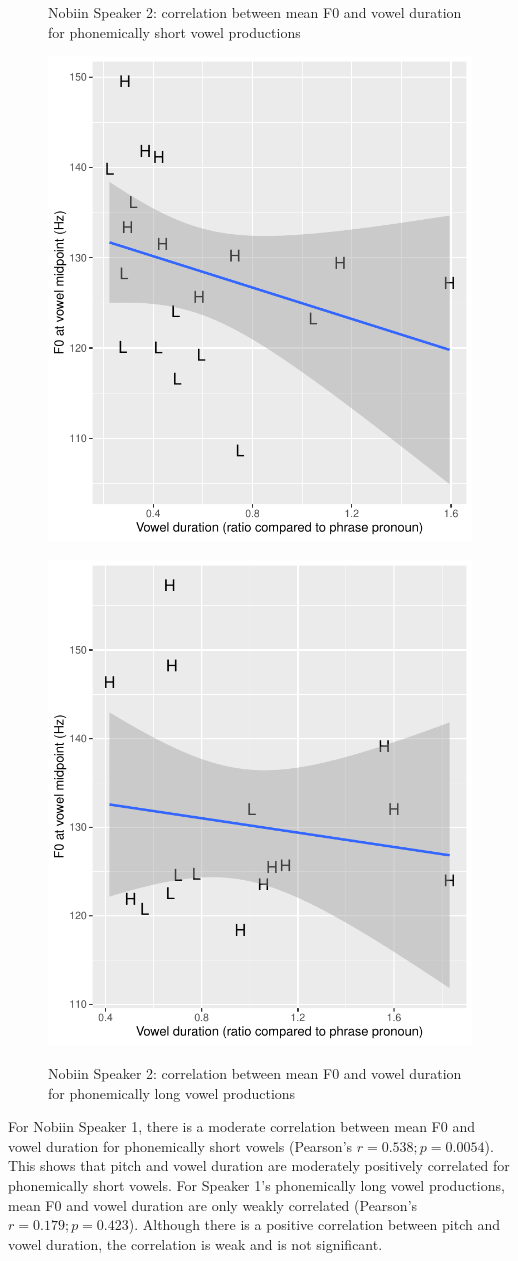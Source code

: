 \documentclass[output=paper]{langscibook}
\begin{document}
\begin{figure}
\begin{floatrow}
 \captionsetup{margin=.05\linewidth}
 \ffigbox
 {\caption{Nobiin Speaker 2: correlation between mean F0 and vowel duration for phonemically short vowel productions\label{fig:oakley:NubanShortVowelsPitchvsDuration}}}
 {\includegraphics[width=.5\textwidth]{figures/NubanShortVowelsPitchvsDuration.pdf}}%
 \ffigbox
 {\caption{Nobiin Speaker 2: correlation between mean F0 and vowel duration for phonemically long vowel productions\label{fig:oakley:NubanLongPitchvsDuration}}}
 {\includegraphics[width=.5\textwidth]{figures/NubanLongPitchvsDuration.pdf}}
\end{floatrow}
\end{figure}

For Nobiin Speaker 1, there is a moderate correlation between mean F0 and vowel duration for phonemically short vowels (Pearson's $r=0.538; p=0.0054$). This shows that pitch and vowel duration are moderately positively correlated for phonemically short vowels. For Speaker 1's phonemically long vowel productions, mean F0 and vowel duration are only weakly correlated (Pearson's $r= 0.179; p=0.423$). Although there is a positive correlation between pitch and vowel duration, the correlation is weak and is not significant.
\end{document}
